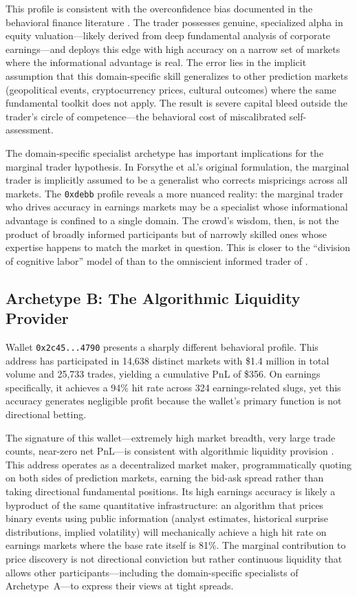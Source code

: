 \documentclass[11pt]{article}
\begin{document}
This profile is consistent with the overconfidence bias documented in the behavioral finance literature \citep{daniel1998investor}. The trader possesses genuine, specialized alpha in equity valuation---likely derived from deep fundamental analysis of corporate earnings---and deploys this edge with high accuracy on a narrow set of markets where the informational advantage is real. The error lies in the implicit assumption that this domain-specific skill generalizes to other prediction markets (geopolitical events, cryptocurrency prices, cultural outcomes) where the same fundamental toolkit does not apply. The result is severe capital bleed outside the trader's circle of competence---the behavioral cost of miscalibrated self-assessment.

The domain-specific specialist archetype has important implications for the marginal trader hypothesis. In Forsythe et al.'s original formulation, the marginal trader is implicitly assumed to be a generalist who corrects mispricings across all markets. The \texttt{0xdebb} profile reveals a more nuanced reality: the marginal trader who drives accuracy in earnings markets may be a specialist whose informational advantage is confined to a single domain. The crowd's wisdom, then, is not the product of broadly informed participants but of narrowly skilled ones whose expertise happens to match the market in question. This is closer to the ``division of cognitive labor'' model of \citet{page2012prediction} than to the omniscient informed trader of \citet{kyle1985continuous}.

\subsection{Archetype B: The Algorithmic Liquidity Provider}

Wallet \texttt{0x2c45...4790} presents a sharply different behavioral profile. This address has participated in 14,638 distinct markets with \$1.4 million in total volume and 25,733 trades, yielding a cumulative PnL of \$356. On earnings specifically, it achieves a 94\% hit rate across 324 earnings-related slugs, yet this accuracy generates negligible profit because the wallet's primary function is not directional betting.

The signature of this wallet---extremely high market breadth, very large trade counts, near-zero net PnL---is consistent with algorithmic liquidity provision \citep{menkveld2013high}. This address operates as a decentralized market maker, programmatically quoting on both sides of prediction markets, earning the bid-ask spread rather than taking directional fundamental positions. Its high earnings accuracy is likely a byproduct of the same quantitative infrastructure: an algorithm that prices binary events using public information (analyst estimates, historical surprise distributions, implied volatility) will mechanically achieve a high hit rate on earnings markets where the base rate itself is 81\%. The marginal contribution to price discovery is not directional conviction but rather continuous liquidity that allows other participants---including the domain-specific specialists of Archetype~A---to express their views at tight spreads.
\end{document}
